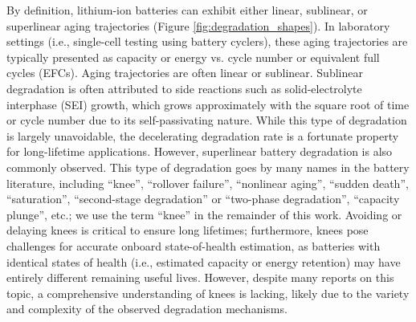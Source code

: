 \documentclass[journal=jpclcd,manuscript=article]{achemso}
\begin{document}
By definition, lithium-ion batteries can exhibit either linear, sublinear, or superlinear aging trajectories (Figure \ref{fig:degradation_shapes}). In laboratory settings (i.e., single-cell testing using battery cyclers), these aging trajectories are typically presented as capacity or energy vs. cycle number or equivalent full cycles (EFCs). Aging trajectories are often linear\cite{ma_editors_2019, keil_electrochemical_2020,  preger_degradation_2020} or sublinear\cite{bloom_accelerated_2001, broussely_aging_2001, wright_calendar-_2002, smith_high_2011, attia_revisiting_2020}. Sublinear degradation is often attributed to side reactions such as solid-electrolyte interphase (SEI) growth, which grows approximately with the square root of time or cycle number due to its self-passivating nature.\cite{bloom_accelerated_2001, broussely_aging_2001, broussely_main_2005, wright_calendar-_2002, smith_high_2011, attia_revisiting_2020} While this type of degradation is largely unavoidable, the decelerating degradation rate is a fortunate property for long-lifetime applications. However, superlinear battery degradation is also commonly observed. This type of degradation goes by many names in the battery literature, including ``knee''\cite{diao_algorithm_2019, fermin-cueto_identification_2020}, ``rollover failure''\cite{ma_editors_2019}, ``nonlinear aging''\cite{schuster_nonlinear_2015, bach_nonlinear_2016, yang_modeling_2017, mandli_analysis_2019, keil_linear_2019, keil_electrochemical_2020, atalay_theory_2020}, ``sudden death''\cite{muller_model-based_2019, willenberg_development_2020, kupper_end--life_2018}, ``saturation''\cite{lin_comprehensive_2013}, ``second-stage degradation''\cite{dubarry_perspective_2020} or ``two-phase degradation''\cite{pugalenthi_piecewise_2020}, ``capacity plunge''\cite{fang_capacity_2021}, etc.; we use the term ``knee'' in the remainder of this work. Avoiding or delaying knees is critical to ensure long lifetimes; furthermore, knees pose challenges for accurate onboard state-of-health estimation, as batteries with identical states of health (i.e., estimated capacity or energy retention) may have entirely different remaining useful lives\cite{dubarry_perspective_2020, braco_experimental_2020}. However, despite many reports on this topic, a comprehensive understanding of knees is lacking, likely due to the variety and complexity of the observed degradation mechanisms.
\end{document}
